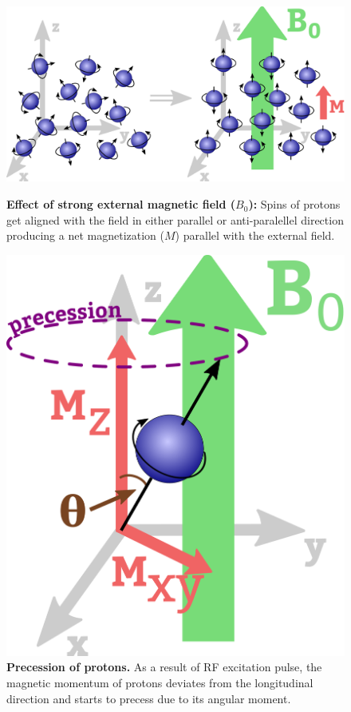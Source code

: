 \begin{figure}[tb]
    \centering
    \begin{minipage}{.52\textwidth}
        \centering
        \includegraphics[width=0.8\linewidth]{images/net_magnetization.pdf}
        \caption{\textbf{Effect of strong external magnetic field ($B_0$):} Spins of protons get aligned with the field in either parallel or anti-paralellel direction producing a net magnetization ($M$) parallel with the external field.}
        \label{fig:net_magnetization}
    \end{minipage}%
    \hspace{0.03\textwidth}
    \begin{minipage}{0.44\textwidth}
        \centering
        \includegraphics[width=0.4\linewidth]{images/precession.pdf}
        \caption{\textbf{Precession of protons.} As a result of RF excitation pulse, the magnetic momentum of protons deviates from the longitudinal direction and starts to precess due to its angular moment.}
        \label{fig:precession}
    \end{minipage}
\end{figure}

